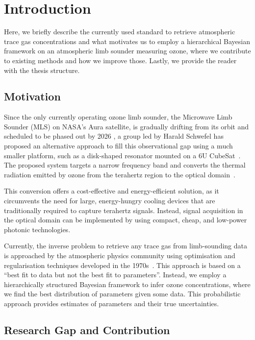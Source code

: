 \chapter{Introduction}
Here, we briefly describe the currently used standard to retrieve atmospheric trace gas concentrations and what motivates us to employ a hierarchical Bayesian framework on an atmospheric limb sounder measuring ozone, where we contribute to existing methods and how we improve those.
Lastly, we provide the reader with the thesis structure.

\section{Motivation}
Since the only currently operating ozone limb sounder, the Microwave Limb Sounder (MLS) on NASA's Aura satellite, is gradually drifting from its orbit and scheduled to be phased out by 2026 \cite{Bryan2024NASA}, a group led by Harald Schwefel has proposed an alternative approach to fill this observational gap using a much smaller platform, such as a disk-shaped resonator mounted on a 6U CubeSat~\cite{ustin2024current}. The proposed system targets a narrow frequency band and converts the thermal radiation emitted by ozone from the terahertz region to the optical domain~\cite{Suresh25,Sedlmeir14}. 

This conversion offers a cost-effective and energy-efficient solution, as it circumvents the need for large, energy-hungry cooling devices that are traditionally required to capture terahertz signals. Instead, signal acquisition in the optical domain can be implemented by using compact, cheap, and low-power photonic technologies.

Currently, the inverse problem to retrieve any trace gas from limb-sounding data is approached by the atmospheric physics community using optimisation and regularisation techniques developed in the 1970s~\cite{rodgers1976retrieval, NASA2022MLSv5}.
This approach is based on a ``best fit to data but not the best fit to parameters''\cite{tan2016LecNot}.
Instead, we employ a hierarchically structured Bayesian framework to infer ozone concentrations, where we find the best distribution of parameters given some data.
This probabilistic approach provides estimates of parameters and their true uncertainties.

\section{Research Gap and Contribution}

